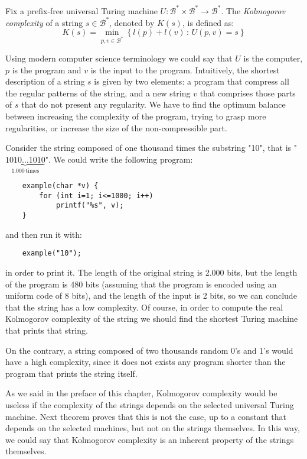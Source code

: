 \begin{definition}
\label{def:Kolmogorov-Complexity}
Fix a prefix-free universal Turing machine $U:\mathcal{B}^\ast \times \mathcal{B}^\ast \rightarrow \mathcal{B}^\ast$. The \emph{Kolmogorov complexity} of a string $s \in \mathcal{B}^\ast$, denoted by $K(s)$, is defined as:
\[
K(s)=\min_{p,v \in \mathcal{B}^\ast}\left\{l(p) + l(v)\,:\, U(p,v)=s\right\}
\]
\end{definition}

Using modern computer science terminology we could say that $U$ is the computer, $p$ is the program and $v$ is the input to the program. Intuitively, the shortest description of a string $s$ is given by two elements: a program that compress all the regular patterns of the string, and a new string $v$ that comprises those parts of $s$ that do not present any regularity. We have to find the optimum balance between increasing the complexity of the program, trying to grasp more regularities, or increase the size of the non-compressible part.

\begin{example}
Consider the string composed of one thousand times the substring "10", that is "$\underbrace{1010\ldots1010}_{1.000\,\mathrm{times}}$". We could write the following program:

\begin{verbatim}
    example(char *v) {
        for (int i=1; i<=1000; i++)
            printf("%s", v);
    }
\end{verbatim}
and then run it with:
\begin{verbatim}
    example("10");
\end{verbatim}

in order to print it. The length of the original string is 2.000 bits, but the length of the program is 480 bits (assuming that the program is encoded using an uniform code of 8 bits), and the length of the input is 2 bits, so we can conclude that the string has a low complexity. Of course, in order to compute the real Kolmogorov complexity of the string we should find the shortest Turing machine that prints that string.

On the contrary, a string composed of two thousands random 0's and 1's would have a high complexity, since it does not exists any program shorter than the program that prints the string itself.
\end{example}

As we said in the preface of this chapter, Kolmogorov complexity would be useless if the complexity of the strings depends on the selected universal Turing machine. Next theorem proves that this is not the case, up to a constant that depends on the selected machines, but not on the strings themselves. In this way, we could say that Kolmogorov complexity is an inherent property of the strings themselves.

